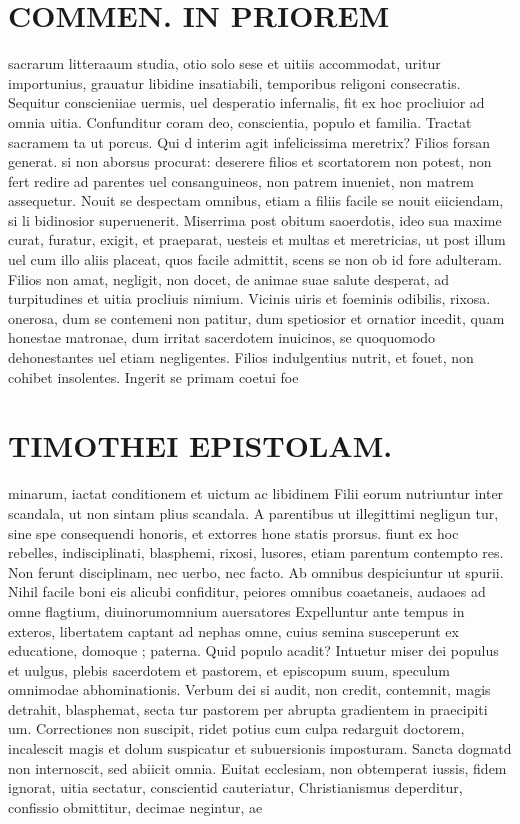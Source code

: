 \documentclass{article}
\begin{document}
\begin{pages}
\section*{COMMEN. IN PRIOREM }
\marginpar{[ p.68 ]}\pstart sacrarum litteraaum studia, otio solo sese et uitiis accommodat, uritur importunius, grauatur libidine insatiabili, temporibus religoni consecratis. Sequitur conscieniiae uermis, uel desperatio infernalis, fit ex hoc procliuior ad omnia uitia. Confunditur coram deo, conscientia, populo et familia. Tractat sacramem ta ut porcus. Qui d interim agit infelicissima meretrix? Filios forsan generat. si non aborsus procurat: deserere filios et scortatorem non potest, non fert redire ad parentes uel consanguineos, non patrem inueniet, non matrem assequetur. Nouit se despectam omnibus, etiam a filiis facile se nouit eiiciendam, si li bidinosior superuenerit. Miserrima post obitum saoerdotis, ideo sua maxime curat, furatur, exigit, et praeparat, uesteis et multas et meretricias, ut post illum uel cum illo aliis placeat, quos facile admittit, scens se non ob id fore adulteram. Filios non amat, negligit, non docet, de animae suae salute desperat, ad turpitudines et uitia procliuis nimium. Vicinis uiris et foeminis odibilis, rixosa. onerosa, dum se contemeni non patitur, dum spetiosior et ornatior incedit, quam honestae matronae, dum irritat sacerdotem inuicinos, se quoquomodo dehonestantes uel etiam negligentes. Filios indulgentius nutrit, et fouet, non cohibet insolentes. Ingerit se primam coetui foe\pend
\section*{TIMOTHEI EPISTOLAM. }
\marginpar{[ p.69 ]}\pstart minarum, iactat conditionem et uictum ac libidinem Filii eorum nutriuntur inter scandala, ut non sintam plius scandala. A parentibus ut illegittimi negligun tur, sine spe consequendi honoris, et extorres hone statis prorsus. fiunt ex hoc rebelles, indisciplinati, blasphemi, rixosi, lusores, etiam parentum contempto res. Non ferunt disciplinam, nec uerbo, nec facto. Ab omnibus despiciuntur ut spurii. Nihil facile boni eis alicubi confiditur, peiores omnibus coaetaneis, audaoes ad omne flagtium, diuinorumomnium auersatores Expelluntur ante tempus in exteros, libertatem captant ad nephas omne, cuius semina susceperunt ex educatione, domoque ; paterna. Quid populo acadit? Intuetur miser dei populus et uulgus, plebis sacerdotem et pastorem, et episcopum suum, speculum omnimodae abhominationis. Verbum dei si audit, non credit, contemnit, magis detrahit, blasphemat, secta tur pastorem per abrupta gradientem in praecipiti um. Correctiones non suscipit, ridet potius cum culpa redarguit doctorem, incalescit magis et dolum suspicatur et subuersionis imposturam. Sancta dogmatd non internoscit, sed abiicit omnia. Euitat ecclesiam, non obtemperat iussis, fidem ignorat, uitia sectatur, conscientid cauteriatur, Christianismus deperditur, confissio obmittitur, decimae negintur, ae  \pend

\end{pages}
\end{document}
